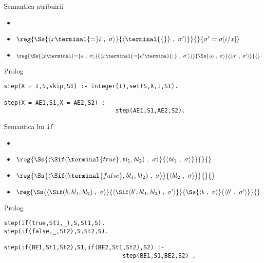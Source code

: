 \documentclass[xcolor=x11names,compress,10pt]{beamer}
\newcommand{\Conf}[2]{\ensuremath{\langle #1\ ,\ #2\rangle}}
\renewcommand{\to}{}
\begin{document}
\begin{frame}[fragile]{Semantica atribuirii}
\vspace*{0.5cm}
 
 
    \begin{itemize}
  \item {} 
    \item[] $\reg{\Ss{\Conf{x \terminal{=} i}{\sigma}}\to{\Conf{\terminal{\{\}}}{\sigma'}}}{}{\sigma'=\sigma[i/x]}$
   \medskip
  \item[] $\reg{\Ss{\Conf{x \terminal{=} a}{\sigma}}\to{\Conf{x \terminal{=} a' \terminal{;}}{\sigma'}}}{\Ss{\Conf{a}{\sigma}}\to{\Conf{a'}{\sigma'}}}{}$
  
\end{itemize}
 
  \begin{block}{Prolog}  
  \begin{verbatim}
step(X = I,S,skip,S1) :- integer(I),set(S,X,I,S1).

step(X = AE1,S1,X = AE2,S2) :- 
                                step(AE1,S1,AE2,S2).
  \end{verbatim}
  \end{block}
  \end{frame}  


\begin{frame}[fragile]{Semantica lui \texttt{if}}
\vspace*{0.5cm}
 
 
    \begin{itemize}
  \item {} 
 \item[]
  $\reg{\Ss{\Conf{\Sif (\terminal{true},{\it bl}_1, {\it bl}_2)}{\sigma}}\to{\Conf{{\it bl}_1}{\sigma}}}{}{}$
   
  \item[]
  $\reg{\Ss{\Conf{\Sif (\terminal{false},{\it bl}_1,{\it bl}_2)}{\sigma}}\to{\Conf{{\it bl}_2}{\sigma}}}{}{}$
   \medskip   
  \item[]
  $\reg{
   \Ss{\Conf{\Sif ({b},{\it bl}_1, {\it bl}_2)}{\sigma}}\to{\Conf{\Sif ({b'}, {\it bl}_1, {\it bl}_2)}{\sigma'}}
  }{
    \Ss{\Conf{b}{\sigma}}\to{\Conf{b'}{\sigma'}}
  }
  {}$
  
\end{itemize}
 
  \begin{block}{Prolog}  
  \begin{verbatim}
step(if(true,St1,_),S,St1,S).
step(if(false,_,St2),S,St2,S).

step(if(BE1,St1,St2),S1,if(BE2,St1,St2),S2) :- 
                                  step(BE1,S1,BE2,S2) .
  \end{verbatim}
  \end{block}
  \end{frame}
  
\end{document}

